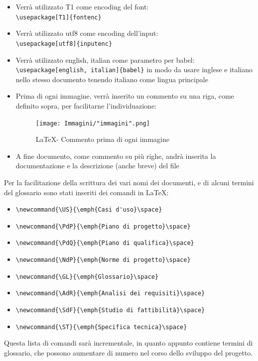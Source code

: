 \documentclass[a4paper]{article}
\newcommand{\PdP}{\emph{Piano di progetto}\space}
\newcommand{\PdQ}{\emph{Piano di qualifica}\space}
\newcommand{\NdP}{\emph{Norme di progetto}\space}
\newcommand{\GL}{\emph{Glossario}\space}
\newcommand{\AdR}{\emph{Analisi dei requisiti}\space}
\newcommand{\SdF}{\emph{Studio di fattibilità}\space}
\newcommand{\ST}{\emph{Specifica tecnica}\space}
\begin{document}
\begin{itemize}
			verranno comunque indentate le parti innestate al loro interno come segue:
			\begin{figure}[H]
				\centering
				\texttt{[image: Immagini/"indent2".png]}
				\caption{\LaTeX \space - Indentazione 2}
			\end{figure}
			\item Verrà utilizzato T1 come encoding del font: \\ \verb|\usepackage[T1]{fontenc}|
			\item Verrà utilizzato utf8 come encoding dell'input: \\ \verb|\usepackage[utf8]{inputenc}|
			\item Verrà utilizzato english, italian come parametro per babel: \\
			\verb|\usepackage[english, italian]{babel}| in modo da usare inglese e italiano nello
			stesso documento tenendo italiano come lingua principale
			\item Prima di ogni immagine, verrà inserito un commento su una riga, come definito
			sopra, per facilitarne l'individuazione:
			\begin{figure}[H]
				\centering
				\texttt{[image: Immagini/"immagini".png]}
				\caption{\LaTeX \space - Commento prima di ogni immagine}
			\end{figure}
			\item A fine documento, come commento su più righe, andrà inserita la documentazione e la descrizione (anche breve) del file
		\end{itemize}
		Per la facilitazione della scrittura dei vari nomi dei documenti, e di alcuni termini del glossario sono stati inseriti dei comandi 
		in \LaTeX :
		\begin{itemize}
			\item \verb|\newcommand{\US}{\emph{Casi d'uso}\space}|
			\item \verb|\newcommand{\PdP}{\emph{Piano di progetto}\space}|
			\item \verb|\newcommand{\PdQ}{\emph{Piano di qualifica}\space}|
			\item \verb|\newcommand{\NdP}{\emph{Norme di progetto}\space}|
			\item \verb|\newcommand{\GL}{\emph{Glossario}\space}|
			\item \verb|\newcommand{\AdR}{\emph{Analisi dei requisiti}\space}|
			\item \verb|\newcommand{\SdF}{\emph{Studio di fattibilità}\space}|
			\item \verb|\newcommand{\ST}{\emph{Specifica tecnica}\space}|
		\end{itemize}
		Questa lista di comandi sarà incrementale, in quanto appunto contiene termini di glossario, che possono aumentare di numero nel corso
		dello sviluppo del progetto.
\end{document}
